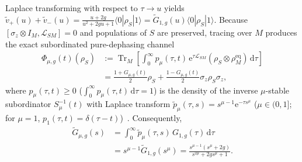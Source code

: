 \documentclass[twocolumn,10pt,amsmath,amssymb,floatfix]{revtex4-2}
\theoremstyle{plain}
\theoremstyle{definition}
\newcommand{\dd}{\mathrm{d}}
\newcommand{\ee}{\mathrm{e}}
\newcommand{\Tr}{\operatorname{Tr}}
\begin{document}
Laplace transforming with respect to $\tau \to u$ yields $\tilde{v}_+(u) + \tilde{v}_-(u) = \frac{u + 2g}{u^2 + 2gu + 1}\langle 0|\rho_S|1\rangle = \tilde{G}_{1,g}(u)\langle 0|\rho_S|1\rangle$. Because $[\sigma_z \otimes I_M, \mathcal{L}_{SM}] = 0$ and populations of $S$ are preserved, tracing over $M$ produces the exact subordinated pure-dephasing channel
\begin{align}
\label{eq:dephasing_map}
\Phi_{\mu,g}(t)(\rho_S) &:= \Tr_M\!\left[\int_0^\infty p_\mu(\tau,t)\,\ee^{\tau\mathcal{L}_{SM}}(\rho_S \otimes \rho_M^{\mathrm{eq}})\,\dd\tau\right] \nonumber\\
&= \frac{1 + G_{\mu,g}(t)}{2}\rho_S + \frac{1 - G_{\mu,g}(t)}{2}\sigma_z \rho_S \sigma_z,
\end{align}
where $p_\mu(\tau,t) \ge 0$ ($\int_0^\infty p_\mu(\tau,t)\,\dd\tau = 1$) is the density of the inverse $\mu$-stable subordinator $S_\mu^{-1}(t)$ with Laplace transform $\tilde{p}_\mu(\tau,s) = s^{\mu-1}\ee^{-\tau s^\mu}$ ($\mu \in (0,1]$; for $\mu=1$, $p_1(\tau,t)=\delta(\tau-t)$)~\cite{Sokolov2002PRE,Meerschaert2004JAP}. Consequently,
\begin{align}
\tilde{G}_{\mu,g}(s) &= \int_0^\infty \tilde{p}_\mu(\tau,s)\,G_{1,g}(\tau)\,\dd\tau \nonumber\\
&= s^{\mu-1}\tilde{G}_{1,g}(s^\mu) = \frac{s^{\mu-1}(s^\mu + 2g)}{s^{2\mu} + 2g s^\mu + 1}.
\end{align}
\end{document}

